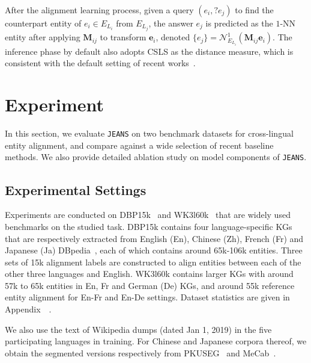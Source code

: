 \documentclass[11pt,a4paper]{article}
\newcommand{\stitle}[1]{\vspace{2ex} \noindent{\bf #1}}
\newcommand{\modelname}[0]{\texttt{JEANS}\xspace}
\begin{document}
After the alignment learning process, given a query $(e_i,?e_j)$ to find the counterpart entity of $e_i\in E_{L_i}$ from $E_{L_j}$,
the answer $e_j$ is predicted as the $1$-NN entity after applying $\mathbf{M}_{ij}$ to transform $\mathbf{e}_i$, denoted $\{e_j\}=\mathcal{N}^1_{E_{L_i}}(\mathbf{M}_{ij}\mathbf{e}_i)$.
The inference phase by default also adopts CSLS as the distance measure, which is consistent with the default setting of recent works~\cite{sun2019transedge,sun2020alinet}.
%
 \section{Experiment}\label{sec:exp}

In this section, we evaluate \modelname on two benchmark datasets for cross-lingual entity alignment, and compare against a wide selection of recent baseline methods.
We also provide detailed ablation study on model components of \modelname.



\subsection{Experimental Settings}\label{sec:exp_set}

\stitle{Datasets.} Experiments are conducted on DBP15k~\cite{sun2017cross} and WK3l60k~\cite{chen2018co} that are widely used benchmarks on the studied task.
DBP15k contains four language-specific KGs that are respectively extracted from English (En), Chinese (Zh), French (Fr) and Japanese (Ja) DBpedia~\cite{lehmann2015dbpedia}, each of which contains around 65k-106k entities. 
Three sets of 15k alignment labels are constructed to align entities between each of the other three languages and English.
WK3l60k contains larger KGs with around 57k to 65k entities in En, Fr and German (De) KGs, and around 55k reference entity alignment for En-Fr and En-De settings.
Dataset statistics are given in Appendix~~\cite{chen2021cross}.

We also use the text of Wikipedia dumps (dated Jan 1, 2019) in the five participating languages in training.
For Chinese and Japanese corpora thereof, we obtain the segmented versions respectively from PKUSEG~\cite{pkuseg} and MeCab~\cite{kudo2006mecab}.
\end{document}
